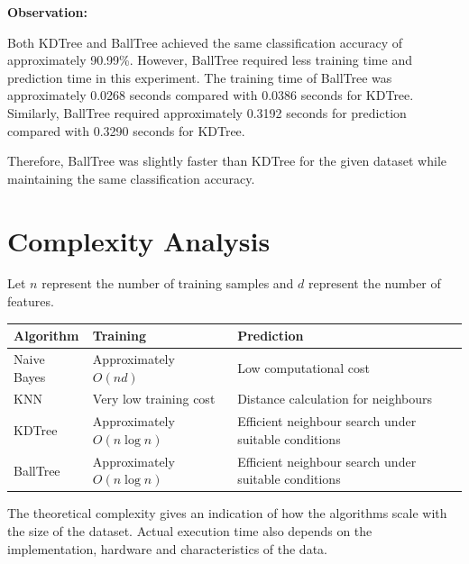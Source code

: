 \documentclass[12pt,a4paper]{article}
\begin{document}
\textbf{Observation:}

Both KDTree and BallTree achieved the same classification accuracy of
approximately 90.99\%. However, BallTree required less training time
and prediction time in this experiment. The training time of BallTree
was approximately 0.0268 seconds compared with 0.0386 seconds for
KDTree. Similarly, BallTree required approximately 0.3192 seconds for
prediction compared with 0.3290 seconds for KDTree.

Therefore, BallTree was slightly faster than KDTree for the given
dataset while maintaining the same classification accuracy.


\section{Complexity Analysis}

Let $n$ represent the number of training samples and $d$ represent the number of features.

\begin{longtable}{|p{4cm}|p{4cm}|p{5cm}|}
\hline
\textbf{Algorithm} &
\textbf{Training} &
\textbf{Prediction} \\ \hline

Naive Bayes &
Approximately $O(nd)$ &
Low computational cost \\ \hline

KNN &
Very low training cost &
Distance calculation for neighbours \\ \hline

KDTree &
Approximately $O(n\log n)$ &
Efficient neighbour search under suitable conditions \\ \hline

BallTree &
Approximately $O(n\log n)$ &
Efficient neighbour search under suitable conditions \\ \hline

\end{longtable}

The theoretical complexity gives an indication of how the algorithms scale with the size of the dataset. Actual execution time also depends on the implementation, hardware and characteristics of the data.

\end{document}
